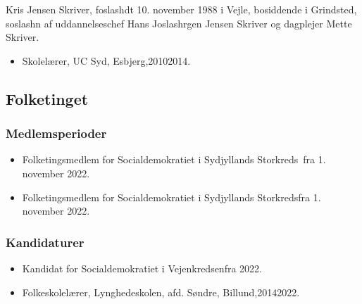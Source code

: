 \documentclass[11pt, a4paper]{awesome-cv}
\begin{document}
\makecvheader[R]
\makelettertitle
\begin{cvletter}
Kris Jensen Skriver, foslashdt 10. november 1988 i Vejle, bosiddende i Grindsted, soslashn af uddannelseschef Hans Joslashrgen Jensen Skriver og dagplejer Mette Skriver.

\begin{itemize}
\item Skolelærer, UC Syd, Esbjerg,20102014.
\end{itemize}
\subsection*{Folketinget}
\subsubsection*{Medlemsperioder}
\begin{itemize}
\item Folketingsmedlem for Socialdemokratiet i Sydjyllands Storkreds fra 1. november 2022.
\item Folketingsmedlem for Socialdemokratiet i Sydjyllands Storkredsfra 1. november 2022.
\end{itemize}
\subsubsection*{Kandidaturer}
\begin{itemize}
\item Kandidat for Socialdemokratiet i Vejenkredsenfra 2022.
\end{itemize}
\begin{itemize}
\item Folkeskolelærer, Lynghedeskolen, afd. Søndre, Billund,20142022.
\end{itemize}
\end{cvletter}
\end{document}

